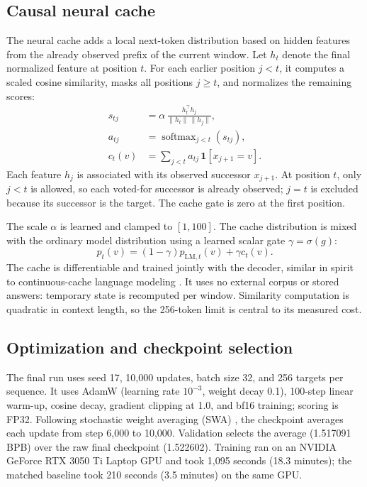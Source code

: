 \documentclass[11pt]{article}
\begin{document}
\subsection{Causal neural cache}
The neural cache adds a local next-token distribution based on hidden features from the already observed prefix of the current window. Let $h_t$ denote the final normalized feature at position $t$. For each earlier position $j<t$, it computes a scaled cosine similarity, masks all positions $j\geq t$, and normalizes the remaining scores:
\begin{align}
s_{tj} &= \alpha\,\frac{h_t^\top h_j}{\|h_t\|\,\|h_j\|}, \\
a_{tj} &= \operatorname{softmax}_{j<t}(s_{tj}), \\
c_t(v) &= \sum_{j<t}a_{tj}\,\mathbf{1}[x_{j+1}=v].
\end{align}
Each feature $h_j$ is associated with its observed successor $x_{j+1}$. At position $t$, only $j<t$ is allowed, so each voted-for successor is already observed; $j=t$ is excluded because its successor is the target. The cache gate is zero at the first position.

The scale $\alpha$ is learned and clamped to $[1,100]$. The cache distribution is mixed with the ordinary model distribution using a learned scalar gate $\gamma=\sigma(g)$:
\[
p_t(v)=(1-\gamma)p_{\mathrm{LM},t}(v)+\gamma c_t(v).
\]
The cache is differentiable and trained jointly with the decoder, similar in spirit to continuous-cache language modeling \cite{grave2017cache}. It uses no external corpus or stored answers: temporary state is recomputed per window. Similarity computation is quadratic in context length, so the 256-token limit is central to its measured cost.

\subsection{Optimization and checkpoint selection}
The final run uses seed 17, 10,000 updates, batch size 32, and 256 targets per sequence. It uses AdamW (learning rate $10^{-3}$, weight decay 0.1), 100-step linear warm-up, cosine decay, gradient clipping at 1.0, and bf16 training; scoring is FP32. Following stochastic weight averaging (SWA) \cite{izmailov2018swa}, the checkpoint averages each update from step 6,000 to 10,000. Validation selects the average (1.517091 BPB) over the raw final checkpoint (1.522602). Training ran on an NVIDIA GeForce RTX 3050 Ti Laptop GPU and took 1,095 seconds (18.3 minutes); the matched baseline took 210 seconds (3.5 minutes) on the same GPU.
\end{document}
